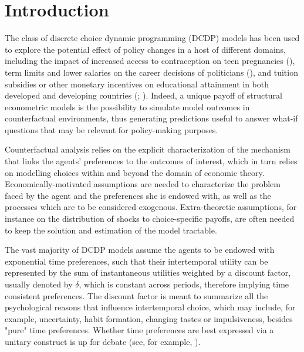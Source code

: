 \section{Introduction}


The class of discrete choice dynamic programming (DCDP) models has been used to explore the potential effect of policy changes in a host of different domains, including the impact of increased access to contraception on teen pregnancies (\cite{Arcidiacono2012}), term limits and lower salaries on the career decisions of politicians (\cite{Diermeier2005}), and tuition subsidies or other monetary incentives on educational attainment in both developed and developing countries (\cite{KeaneWolpin1997}; \cite{ToddWolpin2006}). Indeed, a unique payoff of structural econometric models is the possibility to simulate model outcomes in counterfactual environments, thus generating predictions useful to answer what-if questions that may be relevant for policy-making purposes.

Counterfactual analysis relies on the explicit characterization of the mechanism that links the agents' preferences to the outcomes of interest, which in turn relies on modelling choices within and beyond the domain of economic theory. Economically-motivated assumptions are needed to characterize the problem faced by the agent and the preferences she is endowed with, as well as the processes which are to be considered exogenous. Extra-theoretic assumptions, for instance on the distribution of shocks to choice-specific payoffs, are often needed to keep the solution and estimation of the model tractable.


The vast majority of DCDP models assume the agents to be endowed with exponential time preferences, such that their intertemporal utility can be represented by the sum of instantaneous utilities weighted by a discount factor, usually denoted by $\delta$, which is constant across periods, therefore implying time consistent preferences. The discount factor is meant to summarize all the psychological reasons that influence intertemporal choice, which may include, for example, uncertainty, habit formation, changing tastes or impulsiveness, besides "pure" time preferences. Whether time preferences are best expressed via a unitary construct is up for debate (see, for example, \cite{FrederickLowenstein2002}).

